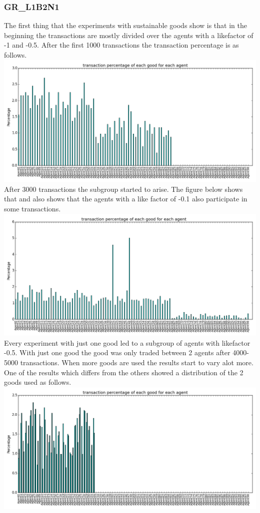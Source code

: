 \documentclass[twoside,openright]{uva-bachelor-thesis}
\begin{document}
\subsubsection{GR\_L1B2N1}
The first thing that the experiments with sustainable goods show is that in the beginning the transactions are mostly divided over the agents with a likefactor of -1 and -0.5. After the first 1000 transactions the transaction percentage is as follows. \\
\includegraphics[scale=0.4]{GR_L1B2N1/1000transactions} \\
After 3000 transactions the subgroup started to arise. The figure below shows that and also shows that the agents with a like factor of -0.1 also participate in some transactions. \\
\includegraphics[scale=0.4]{GR_L1B2N1/3-5ktransactions1good} \\
 Every experiment with just one good led to a subgroup of agents with likefactor -0.5. With just one good the good was  only traded between 2 agents after 4000-5000 transactions. When more goods are used the results start to vary alot more. One of the results which differs from the others showed a distribution of the 2 goods used as follows. \\
\includegraphics[scale=0.4]{GR_L1B2N1/30000transaction2} \\
\end{document}

